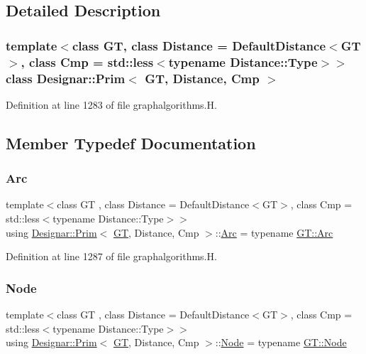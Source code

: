 \subsection{Detailed Description}
\subsubsection*{template$<$class GT, class Distance = Default\+Distance$<$\+G\+T$>$, class Cmp = std\+::less$<$typename Distance\+::\+Type$>$$>$\newline
class Designar\+::\+Prim$<$ G\+T, Distance, Cmp $>$}



Definition at line 1283 of file graphalgorithms.\+H.



\subsection{Member Typedef Documentation}
\mbox{\label{class_designar_1_1_prim_adb1cb5cb91efc05d2a06b5e0825ed609}} 
\subsubsection{\texorpdfstring{Arc}{Arc}}
{\footnotesize\ttfamily template$<$class GT , class Distance  = Default\+Distance$<$\+G\+T$>$, class Cmp  = std\+::less$<$typename Distance\+::\+Type$>$$>$ \\
using \hyperlink{class_designar_1_1_prim}{Designar\+::\+Prim}$<$ \hyperlink{demo-buildgraph_8_c_a3001c40d2c31ca87ed96cd7d1334a55e}{GT}, Distance, Cmp $>$\+::\hyperlink{class_designar_1_1_prim_adb1cb5cb91efc05d2a06b5e0825ed609}{Arc} =  typename \hyperlink{class_designar_1_1_graph_a74c730ef4ce2d20f998d72bd25c2b5bf}{G\+T\+::\+Arc}}



Definition at line 1287 of file graphalgorithms.\+H.

\mbox{\label{class_designar_1_1_prim_a61fb55303a5350e0a6dadd5472571ba6}} 
\subsubsection{\texorpdfstring{Node}{Node}}
{\footnotesize\ttfamily template$<$class GT , class Distance  = Default\+Distance$<$\+G\+T$>$, class Cmp  = std\+::less$<$typename Distance\+::\+Type$>$$>$ \\
using \hyperlink{class_designar_1_1_prim}{Designar\+::\+Prim}$<$ \hyperlink{demo-buildgraph_8_c_a3001c40d2c31ca87ed96cd7d1334a55e}{GT}, Distance, Cmp $>$\+::\hyperlink{class_designar_1_1_prim_a61fb55303a5350e0a6dadd5472571ba6}{Node} =  typename \hyperlink{class_designar_1_1_graph_a5dfc7dba9d092ac489c72e40390c37d0}{G\+T\+::\+Node}}




